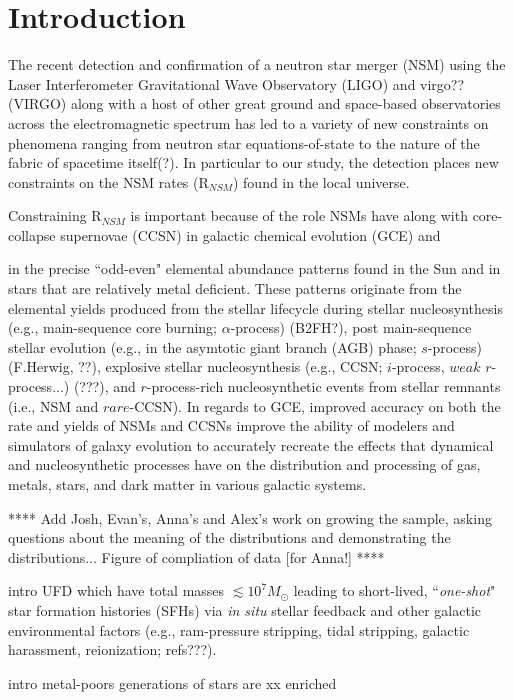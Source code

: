 \section{Introduction}
\label{intro} 
The recent detection and confirmation of a neutron star merger (NSM) using the Laser Interferometer Gravitational Wave Observatory (LIGO) and virgo?? (VIRGO) along with a host of other great ground and space-based observatories across the electromagnetic spectrum has led to a variety of new constraints on phenomena ranging from neutron star equations-of-state to the nature of the fabric of spacetime itself(?). In particular to our study, the detection places new constraints on the NSM rates (R$_{NSM}$) found in the local universe. 

Constraining R$_{NSM}$ is important because of the role NSMs have along with core-collapse supernovae (CCSN) in galactic chemical evolution (GCE) and

in the precise ``odd-even" elemental abundance patterns found in the Sun and in stars that are relatively metal deficient. These patterns originate from the elemental yields produced from the stellar lifecycle during stellar nucleosynthesis (e.g., main-sequence core burning; $\alpha$-process) (B2FH?), post main-sequence stellar evolution (e.g., in the asymtotic giant branch (AGB) phase; $s$-process) (F.Herwig, ??), explosive stellar nucleosynthesis (e.g., CCSN; $i$-process, $weak$ $r$-process...) (???), and $r$-process-rich nucleosynthetic events from stellar remnants (i.e., NSM and $rare$-CCSN). In regards to GCE, improved accuracy on both the rate and yields of NSMs and CCSNs improve the ability of modelers and simulators of galaxy evolution to accurately recreate the effects that dynamical and nucleosynthetic processes have on the distribution and processing of gas, metals, stars, and dark matter in various galactic systems.

****
Add Josh, Evan's, Anna's and Alex's work on growing the sample, asking questions about the meaning of the distributions and demonstrating the distributions... Figure of compliation of data [for Anna!]
****

intro UFD
which have total masses $\lesssim10^7 M_\odot$
leading to short-lived, ``{\it one-shot}" star formation histories (SFHs) via {\it in situ} stellar feedback and other galactic environmental factors (e.g., ram-pressure stripping, tidal stripping, galactic harassment, reionization; refs???). 


intro metal-poors
generations of stars are xx enriched


